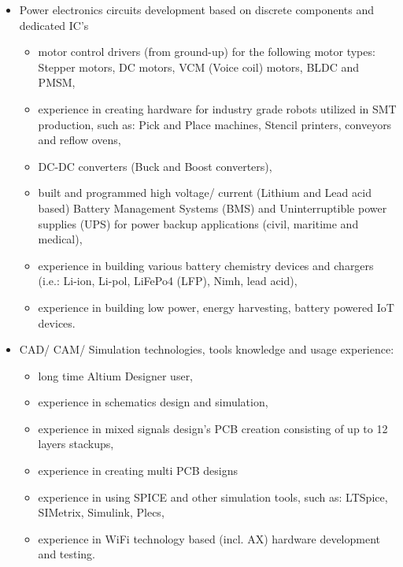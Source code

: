 \documentclass{tccv}
\begin{document}
\begin{itemize}
	\item Power electronics circuits development based on discrete components and dedicated IC's
	\begin{itemize}
		\item motor control drivers (from ground-up) for the following motor types: Stepper motors, DC motors, VCM (Voice coil) motors, BLDC and PMSM,
		\item experience in creating hardware for industry grade robots utilized in SMT production, such as: Pick and Place machines, Stencil printers, conveyors and reflow ovens,
	\item DC-DC converters (Buck and Boost converters),
	\item built and programmed high voltage/ current (Lithium and Lead acid based) Battery Management Systems (BMS) and Uninterruptible power supplies (UPS) for power backup applications (civil, maritime and medical),
	\item experience in building various battery chemistry devices and chargers (i.e.: Li-ion, Li-pol, LiFePo4 (LFP), Nimh, lead acid), 
	\item experience in building low power, energy harvesting, battery powered IoT devices.
	\end{itemize}
\end{itemize}

\begin{itemize}
	\item CAD/ CAM/ Simulation technologies, tools knowledge and usage experience:
	\begin{itemize}
		\item long time Altium Designer user,
		\item experience in schematics design and simulation,
		\item experience in mixed signals design's PCB creation consisting of up to 12 layers stackups,
		\item experience in creating multi PCB designs
		\item experience in using SPICE and other simulation tools, such as: LTSpice, SIMetrix, Simulink, Plecs,
		\item experience in WiFi technology based (incl. AX) hardware development and testing.
		
	\end{itemize}
\end{itemize}
     
\clearpage
\end{document}
